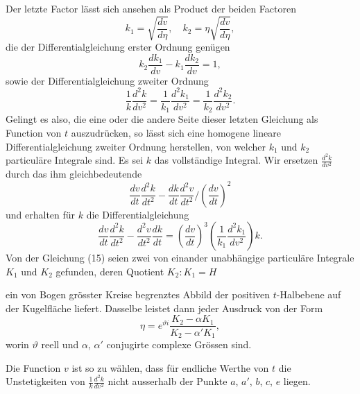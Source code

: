 \documentclass[12pt,a4paper]{article}
\begin{document}
Der letzte Factor l\"asst sich ansehen als Product der beiden Factoren
\begin{equation}\tag{12}
k_{1} = \sqrt{\frac{dv}{d\eta}}, \quad k_{2} = \eta\sqrt{\frac{dv}{d\eta}},
\end{equation}
die der Differentialgleichung erster Ordnung gen\"ugen
\begin{equation}\tag{13}
k_{2} \frac{dk_{1}}{dv} - k_{1} \frac{dk_{2}}{dv} = 1,
\end{equation}
sowie der Differentialgleichung zweiter Ordnung
\begin{equation}\tag{14}
\frac{1}{k} \frac{d^{2}k}{dv^{2}} = \frac{1}{k_{1}} \frac{d^{2}k_{1}}{dv^{2}} = \frac{1}{k_{2}} \frac{d^{2}k_{2}}{dv^{2}}.
\end{equation}
Gelingt es also, die eine oder die andere Seite dieser letzten Gleichung als Function von $t$ auszudr\"ucken, so l\"asst sich eine homogene lineare Differentialgleichung zweiter Ordnung herstellen, von welcher $k_{1}$ und $k_{2}$ particul\"are Integrale sind. Es sei $k$ das vollst\"andige Integral. Wir ersetzen $\frac{d^{2}k}{dv^{2}}$ durch das ihm gleichbedeutende
\[\frac{dv}{dt} \frac{d^{2}k}{dt^{2}} - \frac{dk}{dt} \frac{d^{2}v}{dt^{2}} \bigg/ \left(\frac{dv}{dt}\right)^{2}\]
und erhalten f\"ur $k$ die Differentialgleichung
\begin{equation}\tag{15}
\frac{dv}{dt} \frac{d^{2}k}{dt^{2}} - \frac{d^{2}v}{dt^{2}} \frac{dk}{dt} = \left(\frac{dv}{dt}\right)^{3} \left(\frac{1}{k_{1}} \frac{d^{2}k_{1}}{dv^{2}}\right) k.
\end{equation}
Von der Gleichung (15) seien zwei von einander unabh\"angige particul\"are Integrale $K_{1}$ und $K_{2}$ gefunden, deren Quotient $K_{2}:K_{1} = H$

\newpage
\noindent ein von Bogen gr\"osster Kreise begrenztes Abbild der positiven $t$-Halbebene auf der Kugelfl\"ache liefert. Dasselbe leistet dann jeder Ausdruck von der Form
\begin{equation}\tag{16}
\eta = e^{\vartheta i} \frac{K_{2} - \alpha K_{1}}{K_{2} - \alpha' K_{1}},
\end{equation}
worin $\vartheta$ reell und $\alpha$, $\alpha'$ conjugirte complexe Gr\"ossen sind.

Die Function $v$ ist so zu w\"ahlen, dass f\"ur endliche Werthe von $t$ die Unstetigkeiten von $\frac{1}{k} \frac{d^{2}k}{dv^{2}}$ nicht ausserhalb der Punkte $a$, $a'$, $b$, $c$, $e$ liegen.
\end{document}
